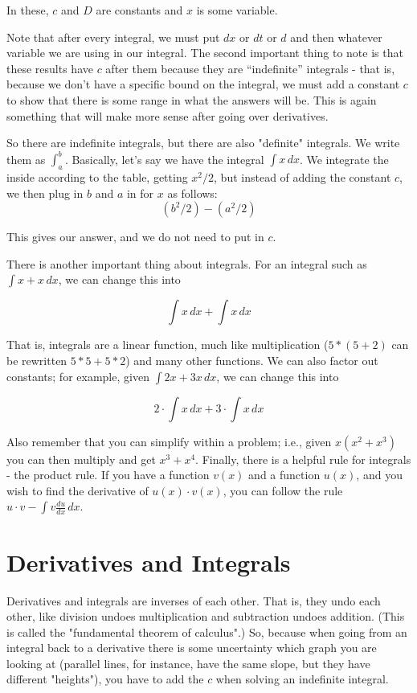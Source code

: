 In these, $c$ and $D$ are constants and $x$ is some variable.

Note that after every integral, we must put $dx$ or $dt$ or $d$ and then whatever variable we are using in our integral. 
The second important thing to note is that these results have $c$ after them because they are ``indefinite'' integrals - that is, because we don't have a specific bound on the integral, we must add a constant $c$ to show that there is some range in what the answers will be. 
This is again something that will make more sense after going over derivatives.

So there are indefinite integrals, but there are also "definite" integrals. 
We write them as $\int^b_a$. Basically, let's say we have the integral $\int x \, dx$. 
We integrate the inside according to the table, getting $x^2/2$, but instead of adding the constant $c$, we then plug in $b$ and $a$ in for $x$ as follows: 
\begin{equation*}
    (b^2/2) - (a^2/2)
\end{equation*}

This gives our answer, and we do not need to put in $c$.

There is another important thing about integrals. For an integral such as $\int x+x \, dx$, we can change this into

\begin{equation*}
    \int x \, dx + \int x \, dx
\end{equation*}

That is, integrals are a linear function, much like multiplication ($5*(5+2)$ can be rewritten $5*5 + 5*2$) and many other functions. We can also factor out constants; for example, given $\int 2x + 3x \, dx$, we can change this into 

\begin{equation*}
    2\cdot \int x \, dx + 3 \cdot \int x \, dx
\end{equation*}

Also remember that you can simplify within a problem; i.e., given $x(x^2 + x^3)$ you can then multiply and get $x^3 + x^4$. 
Finally, there is a helpful rule for integrals - the product rule. 
If you have a function $v(x)$ and a function $u(x)$, and you wish to find the derivative of $u(x)\cdot v(x)$, you can follow the rule $u\cdot v - \int v\frac{du}{dx}\, dx$.
\chapter{Derivatives and Integrals}
Derivatives and integrals are inverses of each other. 
That is, they undo each other, like division undoes multiplication and subtraction undoes addition. 
(This is called the "fundamental theorem of calculus".)
So, because when going from an integral back to a derivative there is some uncertainty which graph you are looking at (parallel lines, for instance, have the same slope, but they have different "heights"), you have to add the $c$ when solving an indefinite integral. 
